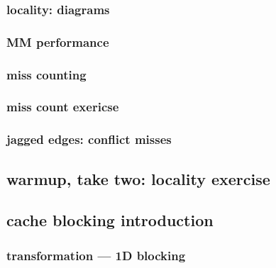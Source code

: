 \subsubsection{locality: diagrams}



\subsubsection{MM performance}


\subsubsection{miss counting}


\subsubsection{miss count exericse}


\subsubsection{jagged edges: conflict misses} %



\subsection{warmup, take two: locality exercise}


\subsection{cache blocking introduction}
%
\subsubsection{transformation --- 1D blocking}






